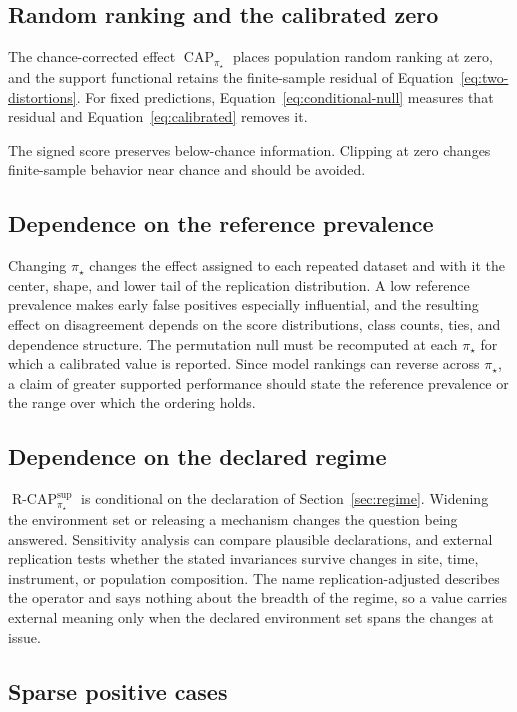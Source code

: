 \documentclass[11pt]{article}
\newcommand{\CAP}{\operatorname{CAP}}
\newcommand{\Tpi}{\CAP_{\pi_\star}}
\newcommand{\RCAP}{\operatorname{R\text{-}CAP}^{\mathrm{sup}}_{\pi_\star}}
\theoremstyle{remark}
\begin{document}
\subsection{Random ranking and the calibrated zero}

The chance-corrected effect $\Tpi$ places population random ranking at zero, and the support functional retains the finite-sample residual of Equation~\eqref{eq:two-distortions}. For fixed predictions, Equation~\eqref{eq:conditional-null} measures that residual and Equation~\eqref{eq:calibrated} removes it.

The signed score preserves below-chance information. Clipping at zero changes finite-sample behavior near chance and should be avoided.

\subsection{Dependence on the reference prevalence}

Changing $\pi_\star$ changes the effect assigned to each repeated dataset and with it the center, shape, and lower tail of the replication distribution. A low reference prevalence makes early false positives especially influential, and the resulting effect on disagreement depends on the score distributions, class counts, ties, and dependence structure. The permutation null must be recomputed at each $\pi_\star$ for which a calibrated value is reported. Since model rankings can reverse across $\pi_\star$, a claim of greater supported performance should state the reference prevalence or the range over which the ordering holds.

\subsection{Dependence on the declared regime}

$\RCAP$ is conditional on the declaration of Section~\ref{sec:regime}. Widening the environment set or releasing a mechanism changes the question being answered. Sensitivity analysis can compare plausible declarations, and external replication tests whether the stated invariances survive changes in site, time, instrument, or population composition. The name replication-adjusted describes the operator and says nothing about the breadth of the regime, so a value carries external meaning only when the declared environment set spans the changes at issue.

\subsection{Sparse positive cases}
\label{sec:sparse}
\end{document}
